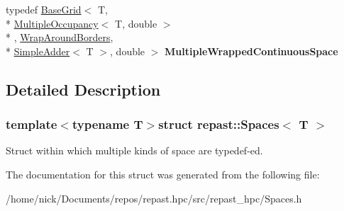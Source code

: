 \begin{DoxyCompactItemize}
\item 
\hypertarget{structrepast_1_1_spaces_a6856d5584ad2ddb01c01f75217903722}{typedef \hyperlink{classrepast_1_1_base_grid}{Base\-Grid}$<$ T, \\*
\hyperlink{classrepast_1_1_multiple_occupancy}{Multiple\-Occupancy}$<$ T, double $>$\\*
, \hyperlink{classrepast_1_1_wrap_around_borders}{Wrap\-Around\-Borders}, \\*
\hyperlink{classrepast_1_1_simple_adder}{Simple\-Adder}$<$ T $>$, double $>$ {\bfseries Multiple\-Wrapped\-Continuous\-Space}}\label{structrepast_1_1_spaces_a6856d5584ad2ddb01c01f75217903722}

\end{DoxyCompactItemize}


\subsection{Detailed Description}
\subsubsection*{template$<$typename T$>$struct repast\-::\-Spaces$<$ T $>$}

Struct within which multiple kinds of space are typedef-\/ed. 

The documentation for this struct was generated from the following file\-:\begin{DoxyCompactItemize}
\item 
/home/nick/\-Documents/repos/repast.\-hpc/src/repast\-\_\-hpc/Spaces.\-h\end{DoxyCompactItemize}

